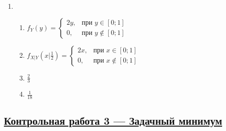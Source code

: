 \begin{multicols}{2}
\begin{enumerate}
\item
\begin{enumerate}
\item $f_{Y}(y) =
\begin{cases} 2y, & \text{при } y \in [0;1] \\
0 , & \text{при } y \not\in [0;1]
\end{cases}$
\item $f_{X|Y}(x|\frac{1}{2}) =
\begin{cases} 2x, & \text{при } x \in [0;1] \\
0 , & \text{при } x \not\in [0;1]
\end{cases}$
\item $\frac{2}{3}$
\item $\frac{1}{18}$
\end{enumerate}
\end{enumerate}
\end{multicols}



\subsection[Кр 3]{\hyperref[sec:minimum_kr_03]{Контрольная работа 3 — Задачный минимум}}
\label{sec:sol_minimum_kr_03}


